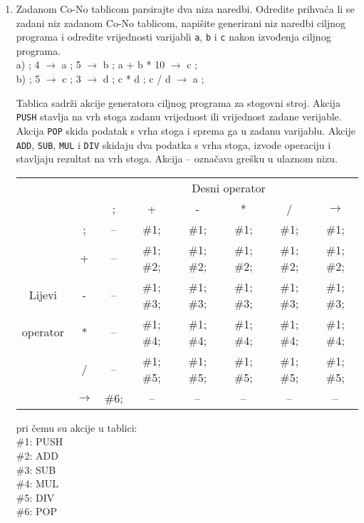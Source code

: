 \documentclass[times, 12pt, utf8]{book}
\begin{document}
\begin{enumerate}[resume]
\item
Zadanom Co-No tablicom parsirajte dva niza naredbi.
Odredite prihvaća li se zadani niz zadanom Co-No tablicom, napišite generirani niz naredbi ciljnog programa i odredite vrijednosti varijabli \texttt{a}, \texttt{b} i \texttt{c} nakon izvođenja ciljnog programa.\\
a) ; 4 \(\to\) a ; 5 \(\to\) b ; a + b * 10 \(\to\) c ; \\
b) ; 5 \(\to\) c ; 3 \(\to\) d ; c * d ; c / d \(\to\) a ;

Tablica sadrži akcije generatora ciljnog programa za stogovni stroj.
Akcija \texttt{PUSH} stavlja na vrh stoga zadanu vrijednost ili vrijednost zadane verijable.
Akcija \texttt{POP} skida podatak s vrha stoga i sprema ga u zadanu varijablu.
Akcije \texttt{ADD}, \texttt{SUB}, \texttt{MUL} i \texttt{DIV} skidaju dva podatka s vrha stoga, izvode operaciju i stavljaju rezultat na vrh stoga. Akcija -- označava grešku u ulaznom nizu. \cite[str.~83-84]{udzbenik} \cite{auditorne}

\begin{tabular}{c c | c | c | c | c | c | c | }
\cline{3-8}
& & \multicolumn{6}{|c|}{Desni operator} \\ \cline{3-8}
& & ; & + & - & * & / & \(\to\) \\ \cline{1-8}
\multicolumn{1}{|c|}{} & ; & -- & \#1; & \#1; & \#1;  & \#1; & \#1;     \\ \cline{2-8}
\multicolumn{1}{|c|}{} & + & -- & \#1; \#2; & \#1; \#2; & \#1; \#2; & \#1; \#2; & \#1; \#2;    \\ \cline{2-8}
\multicolumn{1}{|c|}{Lijevi} & - & -- & \#1; \#3; & \#1; \#3; & \#1; \#3; & \#1; \#3; & \#1; \#3; \\ \cline{2-8}
\multicolumn{1}{|c|}{operator} & * & -- & \#1; \#4; & \#1; \#4; & \#1; \#4; & \#1; \#4; & \#1; \#4; \\ \cline{2-8}
\multicolumn{1}{|c|}{} & / & -- & \#1; \#5; & \#1; \#5; & \#1; \#5; & \#1; \#5; & \#1; \#5; \\ \cline{2-8}
\multicolumn{1}{|c|}{} & \(\to\) & \#6; & -- & -- & -- & -- & -- \\ \cline{1-8}
\end{tabular}

pri čemu su akcije u tablici:\\
\#1: PUSH\\
\#2: ADD\\
\#3: SUB\\
\#4: MUL\\
\#5: DIV\\
\#6: POP\\ 


\end{enumerate}
\end{document}
